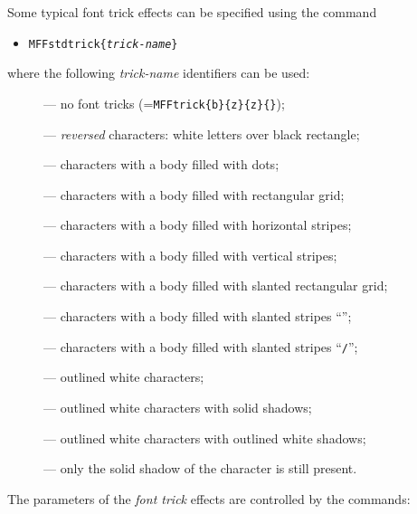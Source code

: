 Some typical font trick effects can be specified using the
command
\begin{itemize}
\item[] {\tt\bs{}MFFstdtrick\{{\em trick-name}\}}
\end{itemize}
where the following {\em trick-name} identifiers can be used:
\begin{description}
\item[] --- no font tricks
(={\tt\bs{}MFFtrick\{b\}\{z\}\{z\}\{\}});
\item[] --- {\em reversed} characters:
white letters over black rectangle;
\item[] --- characters with a body filled with dots;
\item[] --- characters with a body filled with
rectangular grid;
\item[] --- characters with a body filled with
horizontal stripes;
\item[] --- characters with a body filled with
vertical stripes;
\item[] --- characters with a body filled with
slanted rectangular grid;
\item[] --- characters with a body filled with
slanted stripes ``{\tt\bs}'';
\item[] --- characters with a body filled with
slanted stripes ``{\tt/}'';
\item[] --- outlined white characters;
\item[] --- outlined white characters
with solid shadows;
\item[] --- outlined white characters
with outlined white shadows;
\item[] ---
only the solid shadow of the character is still present.
\end{description}
The parameters of the {\em font trick} effects are controlled
by the commands:
